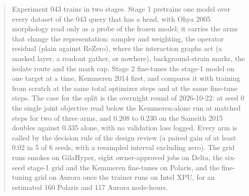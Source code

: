 
\begin{abstract}
\noindent
Experiment 043 trains in two stages. Stage 1 pretrains one model over every dataset of the
043 query that has a head, with Ohya 2005 morphology read only as a probe of the frozen
model; it carries the arms that change the representation: sampler and weighting, the
operator residual (plain against ReZero), where the interaction graphs act (a masked layer,
a readout gather, or nowhere), background-strain marks, the isolate route and the mark cap.
Stage 2 fine-tunes the stage-1 model on one target at a time, Kemmeren 2014 first, and
compares it with training from scratch at the same total optimizer steps and at the same
fine-tune steps. The case for the split is the overnight round of 2026-10-22: at seed 0 the
single joint objective read below the Kemmeren-alone run at matched steps for two of three
arms, and 0.208 to 0.230 on the Sameith 2015 doubles against 0.335 alone, with no
validation loss logged. Every arm is called by the decision rule of the design review (a
paired gain of at least 0.02 in 5 of 6 seeds, with a resampled interval excluding zero).
The grid runs smokes on GilaHyper, eight owner-approved jobs on Delta, the six-seed stage-1
grid and the Kemmeren fine-tunes on Polaris, and the fine-tuning grid on Aurora once the
trainer runs on Intel XPU, for an estimated 160 Polaris and 117 Aurora node-hours.
\end{abstract}
